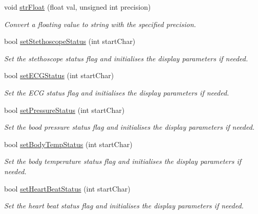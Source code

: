 \begin{DoxyCompactItemize}
void \hyperlink{_meditech___chip_kit_control_panel_8pde_a125eb587e203fa47288d5f3493506628}{str\-Float} (float val, unsigned int precision)
\begin{DoxyCompactList}\small\item\em Convert a floating value to string with the specified precision. \end{DoxyCompactList}\item 
bool \hyperlink{_meditech___chip_kit_control_panel_8pde_af1fb1c240965fd8ff8ad7ecf88651a0d}{set\-Stethoscope\-Status} (int start\-Char)
\begin{DoxyCompactList}\small\item\em Set the stethoscope status flag and initialises the display parameters if needed. \end{DoxyCompactList}\item 
bool \hyperlink{_meditech___chip_kit_control_panel_8pde_affc4e4b28b2554dffef9ef55fc1f23a4}{set\-E\-C\-G\-Status} (int start\-Char)
\begin{DoxyCompactList}\small\item\em Set the E\-C\-G status flag and initialises the display parameters if needed. \end{DoxyCompactList}\item 
bool \hyperlink{_meditech___chip_kit_control_panel_8pde_a962bcf9caf0e8d607a561a6e45c1d4cf}{set\-Pressure\-Status} (int start\-Char)
\begin{DoxyCompactList}\small\item\em Set the bood pressure status flag and initialises the display parameters if needed. \end{DoxyCompactList}\item 
bool \hyperlink{_meditech___chip_kit_control_panel_8pde_a40ac0af2d0c4437faa8aebff8336b19b}{set\-Body\-Temp\-Status} (int start\-Char)
\begin{DoxyCompactList}\small\item\em Set the body temperature status flag and initialises the display parameters if needed. \end{DoxyCompactList}\item 
bool \hyperlink{_meditech___chip_kit_control_panel_8pde_aac2c481fecf0a8b7db0babe49a27d1ea}{set\-Heart\-Beat\-Status} (int start\-Char)
\begin{DoxyCompactList}\small\item\em Set the heart beat status flag and initialises the display parameters if needed. \end{DoxyCompactList}\end{DoxyCompactItemize}
